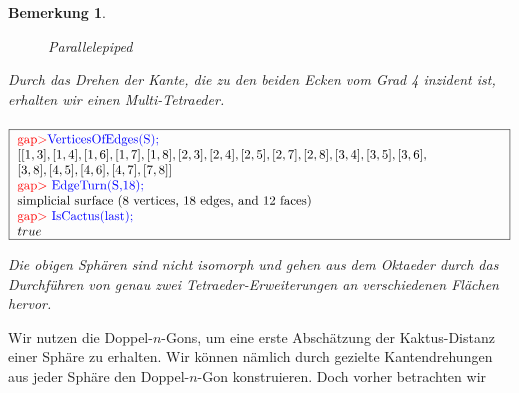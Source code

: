 \documentclass[12pt,titlepage,twoside,cleardoublepage]{article}
\theoremstyle{nummermitklammern}
\newtheorem{bemerkung}[temp]{Bemerkung}
\newtheorem{bemerkung}[zahl]{Bemerkung}
\numberwithin{equation}{section}
\begin{document}
\begin{bemerkung}
\begin{itemize}
\begin{figure}[H]
\caption{Parallelepiped}
\end{figure}
Durch das Drehen der Kante, die zu den beiden Ecken vom Grad 4 inzident ist, erhalten wir einen Multi-Tetraeder.\\\\
$\fbox{
\parbox{13.4cm}{
\textcolor{red}{gap$>$}\textcolor{blue}{ VerticesOfEdges(S);}\newline
$[ [ 1, 3 ], [ 1, 4 ], [ 1, 6 ], [ 1, 7 ], [ 1, 8 ], [ 2, 3 ], [ 2, 4 ], [ 2, 5 ], [ 2, 7 ], [ 2, 8 ], [ 3, 4 ], [ 3, 5 ], [ 3, 6 ], \newline
 [ 3, 8 ],
  [ 4, 5 ], [ 4, 6 ], [ 4, 7 ], [ 7, 8 ] ]$\newline
\textcolor{red}{gap$>$} \textcolor{blue}{EdgeTurn(S,18);}\newline
simplicial surface (8 vertices, 18 edges, and 12 faces)\newline
\textcolor{red}{gap$>$} \textcolor{blue}{IsCactus(last);}\newline
$true$
}}$
\end{itemize}
Die obigen Sphären sind nicht isomorph und gehen aus dem Oktaeder durch das Durchführen von genau zwei Tetraeder-Erweiterungen an verschiedenen Flächen hervor.  
\end{bemerkung}
Wir nutzen die Doppel-$n$-Gons, um eine erste Abschätzung der Kaktus-Distanz einer Sphäre zu erhalten. Wir können nämlich durch gezielte Kantendrehungen aus jeder Sphäre den Doppel-$n$-Gon konstruieren. Doch vorher betrachten wir 
\end{document}
